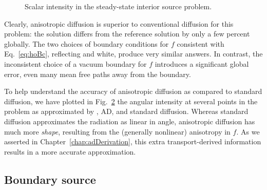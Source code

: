 \begin{figure}[htb]
  \centering
  \hspace{-.25in}%
  
  \caption{Scalar intensity in the steady-state interior source problem.}
  \label{fig:bcReactorFlux}
\end{figure}

Clearly, anisotropic diffusion is superior to conventional diffusion for this
problem: the solution differs
from the reference solution by only a few percent globally. The two choices of
boundary conditions for $f$ consistent with Eq.~\eqref{eq:hoBc}, reflecting and
white, produce very similar answers. In contrast, the inconsistent choice of a
vacuum boundary for $f$ introduces a significant global error, even many mean
free paths away from the boundary.

To help understand the accuracy of anisotropic diffusion as compared to standard
diffusion, we have plotted in Fig.~\ref{fig:bcReactorAngular} the angular
intensity at several points in the problem as approximated by \SN, AD, and
standard diffusion. Whereas standard diffusion approximates the radiation as linear in
angle, anisotropic diffusion has much more \emph{shape}, resulting from the
(generally nonlinear)
anisotropy in $f$. As we asserted in Chapter~\ref{chap:adDerivation}, this extra
transport-derived information results in a more accurate approximation.

\begin{figure}[htb]
  \centering\small
  \subfloat[$I(2.5,0,\omega)$]{%
    \hspace{-.25in}%
    }

  \subfloat[$I(2.5,10,\omega)$]{%
    \hspace{-.25in}%
    }%
  \subfloat[$I(1.55,5,\omega)$]{%
    \hspace{-.25in}%
    }%
  \label{fig:bcReactorAngular}
\end{figure}

\clearpage
\subsection{Boundary source}

